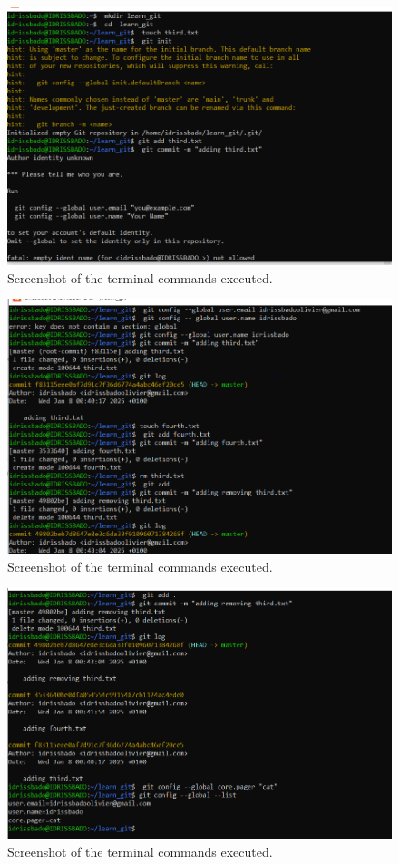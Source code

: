 \documentclass{article}
\begin{document}
\begin{figure}[h!]
    \centering
    \includegraphics[width=1.4\textwidth]{idriss1.PNG}  
    \caption{Screenshot of the terminal commands executed.}
    \label{fig:screenshot}
\end{figure}
\begin{figure}[h!]
    \centering
    \includegraphics[width=1.4\textwidth]{IDRISS2.PNG} 
    \caption{Screenshot of the terminal commands executed.}
    \label{fig:screenshot}
\end{figure}
\begin{figure}[h!]
    \centering
    \includegraphics[width=1.4\textwidth]{IDRISS3.PNG} 
    \caption{Screenshot of the terminal commands executed.}
    \label{fig:screenshot}
\end{figure}
\end{document}
